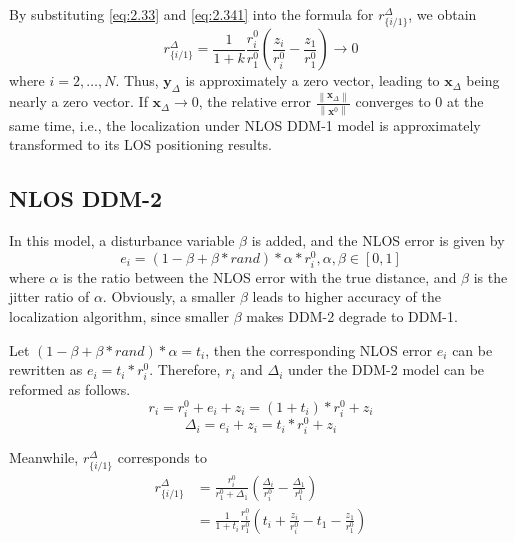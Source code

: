 \documentclass[journal]{IEEEtran}
\begin{document}
By substituting \eqref{eq:2.33} and \eqref{eq:2.341} into the formula for ${{r}_{\{i/1\}}^{\Delta}}$, we obtain
 \begin{equation}\label{eq:2.351} 
   {{r}_{\{i/1\}}^{\Delta}} = 
 {\frac{1}{1+k}}{\frac{r_{i}^{0}}{r_{1}^{0}}}\left(\frac{z {_{i}}}{r_{i}^{0}}-\frac{z{_{1}}}{r_{1}^{0}} \right) \rightarrow 0
\end{equation}
where $i = 2, \ldots, N$. Thus, $\mathbf{y}_{\Delta}$ is approximately a zero vector, leading to $\mathbf{x}_{\Delta}$ being nearly a zero vector. If $\mathbf{x}_{\Delta} \rightarrow 0$, the relative error ${\frac{\left\|\mathbf{x}_{\Delta}\right\|}{\left\|\mathbf{x}^{0}\right\|}}$ converges to 0 at the same time, i.e., the localization under NLOS DDM-1 model is approximately transformed to its LOS positioning results.
\subsection{NLOS DDM-2}

In this model, a disturbance variable ${\beta}$ is added, and the NLOS error is given by
\begin{equation}\label{eq:2.34}
{{e}_{i}}=\left(1-\beta +\beta *rand\right)*\alpha *{{r}_{i}^{0}},{\alpha ,\beta \in \left[ 0,1 \right]}
\end{equation}
where ${\alpha }$ is the ratio between the NLOS error with the true distance, and ${\beta }$ is the jitter ratio of ${\alpha }$. Obviously, a smaller ${\beta }$ leads to higher accuracy of the localization algorithm, since smaller ${\beta}$ makes DDM-2 degrade to DDM-1.

Let $ {\left(1-\beta +\beta *rand\right)*\alpha = {t_i}} $, then the corresponding NLOS error $e_i$ can be rewritten as $ {{e_i} = {t_i}*{r_{i}^{0}}} $. Therefore,  $r_{i} $ and ${\Delta}_{i}$ under the DDM-2 model can be reformed as follows.
\begin{equation}\label{eq:2.35}
{r_i} = r_i^0 + {e_i} + {z_i} = \left(1+{t_i}\right)*{{r}_{i}^{0}}+{z_i}
 \end{equation}
 \begin{equation}\label{eq:2.36}
{{\Delta}_i} = {e_i} + {z_i} = {t_i}*{{r}_{i}^{0}}+{z_i}
 \end{equation}

Meanwhile, $ {{r}_{\{i/1\}}^{\Delta}} $ corresponds to
\begin{equation}\label{eq:2.37}
\begin{aligned}
{{r}_{\{i/1\}}^{\Delta}} &= \frac{r_{i}^{0}}{r_{1}^{0}+\Delta {_{1}}} \left(\frac{\Delta {_{i}}}{r_{i}^{0}}-\frac{\Delta {_{1}}}{r_{1}^{0}}\right)\\
&={\frac{1}{1+{t_i}}}{\frac{r_{i}^{0}}{r_{1}^{0}}}\left({t_i}+{\frac{z {_{i}}}{r_{i}^{0}}}-{t_1}-{\frac{z{_{1}}}{r_{1}^{0}}} \right)
\end{aligned}
\end{equation}
\end{document}
